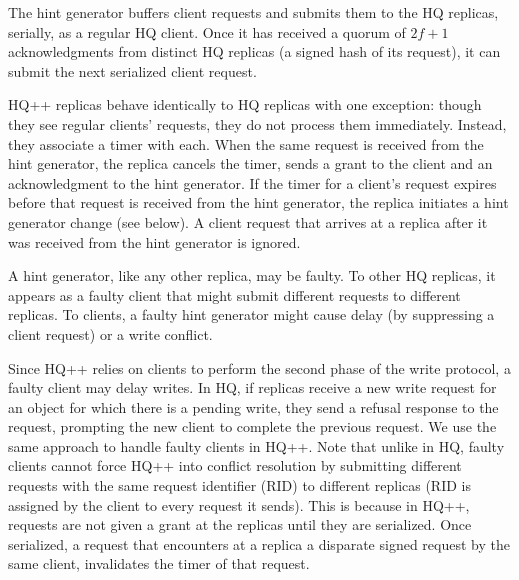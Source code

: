 \documentclass[twocolumn,10pt]{article}
\begin{document}
The hint generator buffers client requests and submits them to the %
HQ replicas, serially, as a regular HQ client.  Once it has received a
quorum of $2f+1$ acknowledgments from distinct HQ replicas (a signed hash
of its request), it can submit the next serialized client request. %


 HQ++ replicas behave identically to HQ replicas with one
exception: though they see regular clients' requests, they do not
process them immediately. Instead, they associate a timer with each.
When the same request is received from the hint generator, the replica
cancels the timer, sends a grant to the client and an
acknowledgment to the hint generator.  If the timer for a client's
request expires before that request is received from the hint
generator, the replica initiates a hint generator change (see below).
A client request that arrives at a replica after it was received from
the hint generator is ignored.



 A hint generator, like any other
replica, may be faulty. To other HQ replicas, it appears as a faulty
client that might submit different requests to different replicas.  To
clients, a faulty hint generator might cause delay (by suppressing a
client request) or a write conflict. 

 Since HQ++ relies on clients to perform the
second phase of the write protocol, a faulty client may delay writes. In HQ, if replicas receive a
new write request for an object for which there is a pending write,
they send a refusal response to the request, prompting the new client
to complete the previous request.  We use the same approach to handle
faulty clients in HQ++.  Note that unlike in HQ, faulty clients cannot
force HQ++ into conflict resolution by submitting different requests
with the same request identifier (RID) to different replicas (RID is assigned 
by the client to every request it sends). This is because in HQ++,
requests are not given a grant at the replicas until they are serialized.
Once serialized, a request that encounters at a replica a disparate
signed request by the same client,  invalidates the timer of that
request. 

\end{document}
